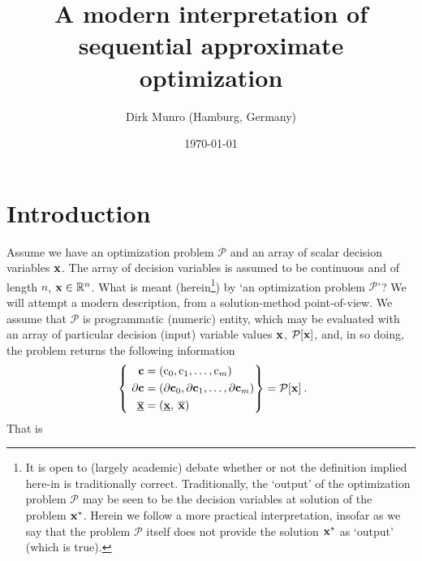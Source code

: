 \documentclass[11pt]{article}
\title{A modern interpretation of sequential approximate optimization}
\author{Dirk Munro (Hamburg, Germany)}
\date{\today }
\begin{document}
\maketitle

\section{Introduction}

Assume we have an optimization problem $\mathcal{P}$ and an array of scalar decision variables $\mathbf{x}$. The array of decision variables is assumed to be continuous and of length $n$, $\mathbf{x} \in \mathbb{R}^n$. What is meant (herein\footnote{It is open to (largely academic) debate whether or not the definition implied here-in is traditionally correct. Traditionally, the `output' of the optimization problem $\mathcal{P}$ may be seen to be the decision variables at solution of the problem $\mathbf{x}^\ast$. Herein we follow a more practical interpretation, insofar as we say that the problem $\mathcal{P}$ itself does not provide the solution $\mathbf{x}^\ast$ as `output' (which is true).}) by `an optimization problem $\mathcal{P}$'? We will attempt a modern description, from a solution-method point-of-view. We assume that $\mathcal{P}$ is programmatic (numeric) entity, which may be evaluated with an array of particular decision (input) variable values $\mathbf{x}$, $\mathcal{P}[\mathbf{x}]$, and, in so doing, the problem returns the following information
\begin{align}
\label{d:eqn:p}
 ~\left\{ ~
\begin{aligned}
\mathbf{c} &= (\textrm{c}_0, \textrm{c}_1, \ldots, \textrm{c}_m ) \\
\mathbf{\partial c} & = (\mathbf{\partial c}_0 , \mathbf{\partial c}_1 , \ldots,\mathbf{\partial c}_m  ) \\ \underline{\overline{\mathbf{x}}} & = ( \underline{\mathbf{x}} , \: \overline{\mathbf{x}} ) \:
\end{aligned}\right\} =
\mathcal{P} [\mathbf{x}] \: .
\end{align}
That is 
\end{document}
